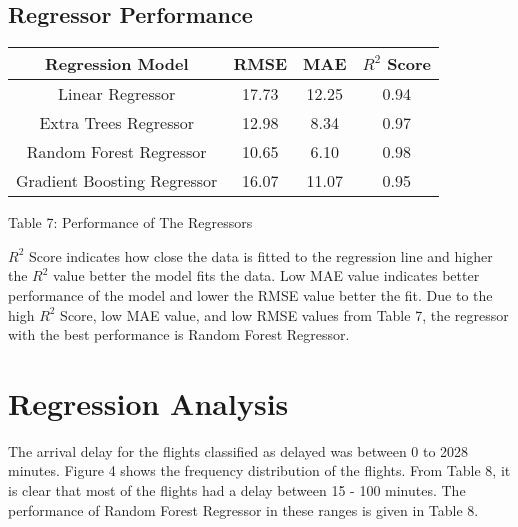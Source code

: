 \documentclass[12pt,letterpaper]{article}
\begin{document}
    
    \subsection*{Regressor Performance}
        
        \begin{table}[H]
            \begin{center}
                \begin{tabular}{ |c|c|c|c| } 
                    \hline
                    Regression Model & RMSE & MAE & $R^2$ Score\\ 
                    \hline
                    Linear Regressor & 17.73 & 12.25 & 0.94\\ 
                    \hline
                    Extra Trees Regressor & 12.98 & 8.34 & 0.97\\ 
                    \hline
                    Random Forest Regressor & 10.65 & 6.10 & 0.98\\ 
                    \hline
                    Gradient Boosting Regressor & 16.07 & 11.07 & 0.95\\ 
                    \hline
                \end{tabular}
            \end{center}
            \begin{center}
                Table 7: Performance of The Regressors
            \end{center}
        \end{table}
        
        
    $R^2$ Score indicates how close the data is fitted to the regression line and higher the $R^2$ value better the model fits the data. Low MAE value indicates better performance of the model and lower the RMSE value better the fit. Due to the high $R^2$ Score, low MAE value, and low RMSE values from Table 7, the regressor with the best performance is Random Forest Regressor.
        
\section{Regression Analysis}   

    The arrival delay for the flights classified as delayed was between 0 to 2028 minutes. Figure 4 shows the frequency distribution of the flights. From Table 8, it is clear that most of the flights had a delay between 15 - 100 minutes. The performance of Random Forest Regressor in these ranges is given in Table 8. 
    
\end{document}
